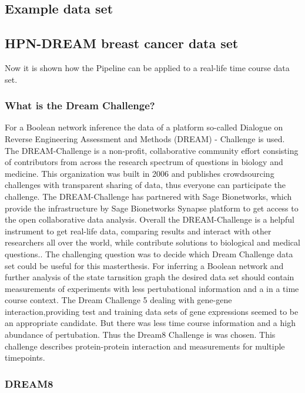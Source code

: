 \subsection{Example data set}
%
\subsection{HPN-DREAM breast cancer data set}
Now it is shown how the Pipeline can be applied to a real-life time course data set. 
\subsubsection*{What is the Dream Challenge?}
For a Boolean network inference the data of a platform so-called Dialogue on Reverse Engineering Assessment and Methods (DREAM) - Challenge is used. The DREAM-Challenge is a non-profit, collaborative community effort consisting of contributors from across the research spectrum of questions in biology and medicine. This organization was built in 2006 and publishes crowdsourcing challenges with transparent sharing of data, thus everyone can participate the challenge. The DREAM-Challenge has partnered with Sage Bionetworks, which provide the infrastructure by Sage Bionetworks Synapse platform to get access to the open collaborative data analysis. Overall the DREAM-Challenge is a helpful instrument to get real-life data, comparing results and interact with other researchers all over the world, while contribute solutions to biological and medical questions.\citep{DreamChalleneg Homepage}.
The challenging question was to decide which Dream Challenge data set could be useful for this masterthesis. For inferring a Boolean network and further analysis of the state tarnsition graph the desired data set should contain measurements of experiments with less pertubational information and a in a time course context. 
The Dream Challenge 5 dealing with gene-gene interaction,providing test and training data sets of gene expressions seemed to be an appropriate candidate. But there was less time course information and a high abundance of pertubation. Thus the Dream8 Challenge is was chosen. This challenge describes protein-protein interaction and measurements for multiple timepoints.

\subsubsection{DREAM8}

